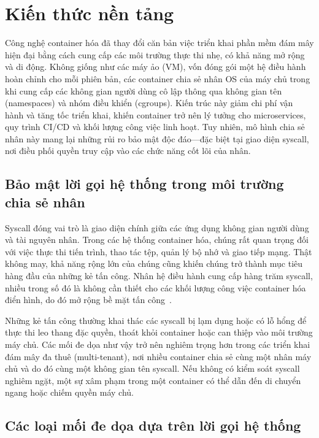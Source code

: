 \section{Kiến thức nền tảng}
\label{sec:background}

Công nghệ container hóa đã thay đổi căn bản việc triển khai phần mềm đám mây hiện đại bằng cách cung cấp các môi trường thực thi nhẹ, có khả năng mở rộng và di động. Không giống như các máy ảo (VM), vốn đóng gói một hệ điều hành hoàn chỉnh cho mỗi phiên bản, các container chia sẻ nhân OS của máy chủ trong khi cung cấp các không gian người dùng cô lập thông qua không gian tên (namespaces) và nhóm điều khiển (cgroups). Kiến trúc này giảm chi phí vận hành và tăng tốc triển khai, khiến container trở nên lý tưởng cho microservices, quy trình CI/CD và khối lượng công việc linh hoạt. Tuy nhiên, mô hình chia sẻ nhân này mang lại những rủi ro bảo mật độc đáo---đặc biệt tại giao diện syscall, nơi điều phối quyền truy cập vào các chức năng cốt lõi của nhân.

\subsection{Bảo mật lời gọi hệ thống trong môi trường chia sẻ nhân}
\label{subsec:syscall_security}

Syscall đóng vai trò là giao diện chính giữa các ứng dụng không gian người dùng và tài nguyên nhân. Trong các hệ thống container hóa, chúng rất quan trọng đối với việc thực thi tiến trình, thao tác tệp, quản lý bộ nhớ và giao tiếp mạng. Thật không may, khả năng rộng lớn của chúng cũng khiến chúng trở thành mục tiêu hàng đầu của những kẻ tấn công. Nhân hệ điều hành cung cấp hàng trăm syscall, nhiều trong số đó là không cần thiết cho các khối lượng công việc container hóa điển hình, do đó mở rộng bề mặt tấn công~\cite{ref11_shu_security}.

Những kẻ tấn công thường khai thác các syscall bị lạm dụng hoặc có lỗ hổng để thực thi leo thang đặc quyền, thoát khỏi container hoặc can thiệp vào môi trường máy chủ. Các mối đe dọa như vậy trở nên nghiêm trọng hơn trong các triển khai đám mây đa thuê (multi-tenant), nơi nhiều container chia sẻ cùng một nhân máy chủ và do đó cùng một không gian tên syscall. Nếu không có kiểm soát syscall nghiêm ngặt, một sự xâm phạm trong một container có thể dẫn đến di chuyển ngang hoặc chiếm quyền máy chủ.

\subsection{Các loại mối đe dọa dựa trên lời gọi hệ thống}
\label{subsec:syscall_threats}

